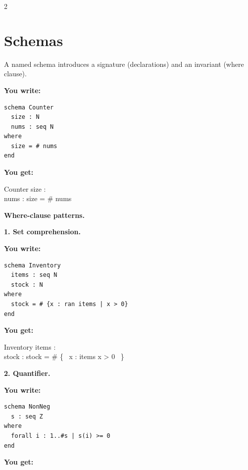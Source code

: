 \documentclass[10pt,landscape,a4paper]{article}
\newenvironment{exwrite}%
  {\par\nobreak\noindent\scriptsize\textbf{You write:}\par\nobreak\vspace{0pt}\scriptsize}%
  {\vspace{1pt}\nobreak}
\newenvironment{exget}%
  {\par\nobreak\noindent\scriptsize\textbf{You get:}\par\nobreak\vspace{0pt}\small}%
  {\par\vspace{3pt}}
\begin{document}
\newpage
\begin{multicols}{2}
\raggedcolumns
\section{Schemas}

{\scriptsize A named schema introduces a signature (declarations) and an invariant (where clause).}

\begin{exwrite}%
\begin{verbatim}
schema Counter
  size : N
  nums : seq N
where
  size = # nums
end
\end{verbatim}
\end{exwrite}
\begin{exget}%
\begin{schema}{Counter}
size : \nat \\
nums : \seq \nat
\where
size = \# nums
\end{schema}
\end{exget}

\smallskip
{}
\textbf{Where-clause patterns.}

\textbf{1. Set comprehension.}
\begin{exwrite}%
\begin{verbatim}
schema Inventory
  items : seq N
  stock : N
where
  stock = # {x : ran items | x > 0}
end
\end{verbatim}
\end{exwrite}
\begin{exget}%
\begin{schema}{Inventory}
items : \seq \nat \\
stock : \nat
\where
stock = \# \{~ x : \ran items \mid x > 0 ~\}
\end{schema}
\end{exget}

\textbf{2. Quantifier.}
\begin{exwrite}%
\begin{verbatim}
schema NonNeg
  s : seq Z
where
  forall i : 1..#s | s(i) >= 0
end
\end{verbatim}
\end{exwrite}
\begin{exget}%
\end{exget}


\end{multicols}
\end{document}
